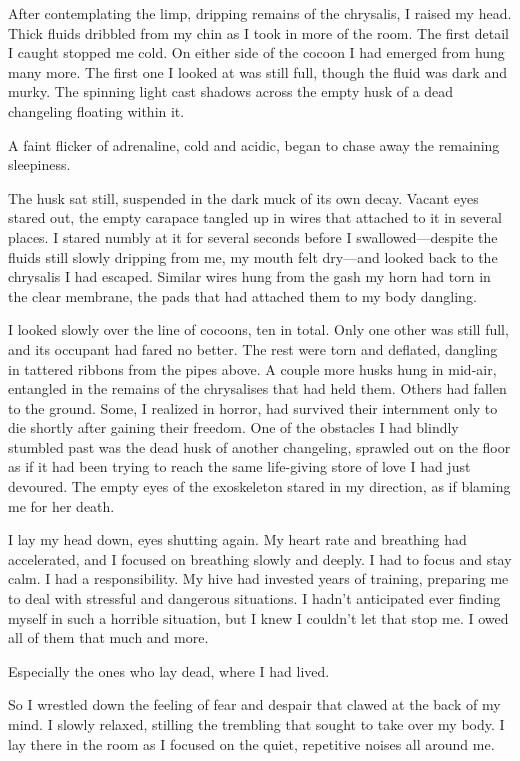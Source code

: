 After contemplating the limp, dripping remains of the chrysalis, I raised my head. Thick fluids dribbled from my chin as I took in more of the room. The first detail I caught stopped me cold. On either side of the cocoon I had emerged from hung many more. The first one I looked at was still full, though the fluid was dark and murky. The spinning light cast shadows across the empty husk of a dead changeling floating within it.

A faint flicker of adrenaline, cold and acidic, began to chase away the remaining sleepiness.

The husk sat still, suspended in the dark muck of its own decay. Vacant eyes stared out, the empty carapace tangled up in wires that attached to it in several places. I stared numbly at it for several seconds before I swallowed—despite the fluids still slowly dripping from me, my mouth felt dry—and looked back to the chrysalis I had escaped. Similar wires hung from the gash my horn had torn in the clear membrane, the pads that had attached them to my body dangling.

I looked slowly over the line of cocoons, ten in total. Only one other was still full, and its occupant had fared no better. The rest were torn and deflated, dangling in tattered ribbons from the pipes above. A couple more husks hung in mid-air, entangled in the remains of the chrysalises that had held them. Others had fallen to the ground. Some, I realized in horror, had survived their internment only to die shortly after gaining their freedom. One of the obstacles I had blindly stumbled past was the dead husk of another changeling, sprawled out on the floor as if it had been trying to reach the same life-giving store of love I had just devoured. The empty eyes of the exoskeleton stared in my direction, as if blaming me for her death.

I lay my head down, eyes shutting again. My heart rate and breathing had accelerated, and I focused on breathing slowly and deeply. I had to focus and stay calm. I had a responsibility. My hive had invested years of training, preparing me to deal with stressful and dangerous situations. I hadn’t anticipated ever finding myself in such a horrible situation, but I knew I couldn’t let that stop me. I owed all of them that much and more.

Especially the ones who lay dead, where I had lived.

So I wrestled down the feeling of fear and despair that clawed at the back of my mind. I slowly relaxed, stilling the trembling that sought to take over my body. I lay there in the room as I focused on the quiet, repetitive noises all around me.

